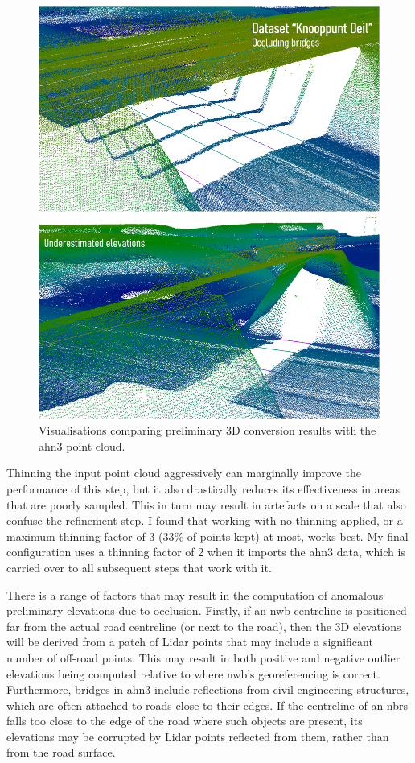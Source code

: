 \begin{figure}
    \centering
    \includegraphics[width=\linewidth]{final_report/figs/elevationestimation2.png}
    \caption{Visualisations comparing preliminary 3D conversion results with the \ac{ahn3} point cloud.}
    \label{fig:elevationestimation2}
\end{figure}

Thinning the input point cloud aggressively can marginally improve the performance of this step, but it also drastically reduces its effectiveness in areas that are poorly sampled. This in turn may result in artefacts on a scale that also confuse the refinement step. I found that working with no thinning applied, or a maximum thinning factor of 3 (33\% of points kept) at most, works best. My final configuration uses a thinning factor of 2 when it imports the \ac{ahn3} data, which is carried over to all subsequent steps that work with it.

There is a range of factors that may result in the computation of anomalous preliminary elevations due to occlusion. Firstly, if an \ac{nwb} centreline is positioned far from the actual road centreline (or next to the road), then the 3D elevations will be derived from a patch of Lidar points that may include a significant number of off-road points. This may result in both positive and negative outlier elevations being computed relative to where \ac{nwb}'s georeferencing is correct. Furthermore, bridges in \ac{ahn3} include reflections from civil engineering structures, which are often attached to roads close to their edges. If the centreline of an \ac{nbrs} falls too close to the edge of the road where such objects are present, its elevations may be corrupted by Lidar points reflected from them, rather than from the road surface.

